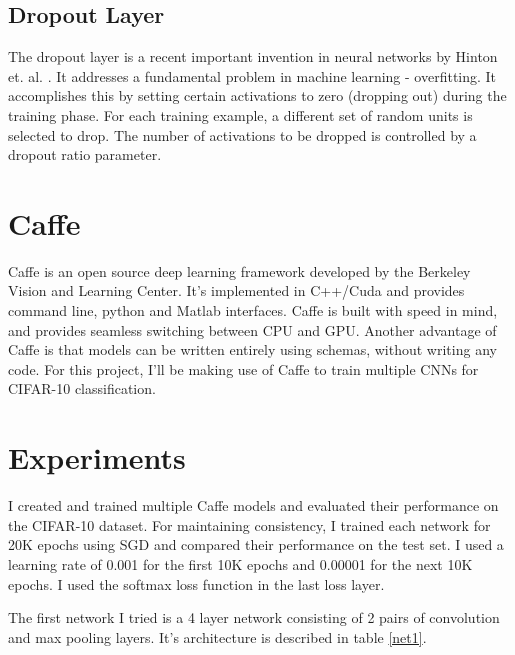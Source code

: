 \documentclass[10pt,twocolumn,letterpaper]{article}
\begin{document}
\subsection{Dropout Layer}
The dropout layer is a recent important invention in neural networks by Hinton et. al. \cite{hinton2012improving}. It addresses a fundamental problem in machine learning - overfitting. It accomplishes this by setting certain activations to zero (dropping out) during the training phase. For each training example, a different set of random units is selected to drop. The number of activations to be dropped is controlled by a dropout ratio parameter.




\section{Caffe}
Caffe is an open source deep learning framework developed by the Berkeley Vision and Learning Center. It's implemented in C++/Cuda and provides command line, python and Matlab interfaces. Caffe is built with speed in mind, and provides seamless switching between CPU and GPU. Another advantage of Caffe is that models can be written entirely using schemas, without writing any code. For this project, I'll be making use of Caffe to train multiple CNNs for CIFAR-10 classification.

\section{Experiments}

I created and trained multiple Caffe models and evaluated their performance on the CIFAR-10 dataset. For maintaining consistency, I trained each network for 20K epochs using SGD and compared their performance on the test set. I used a learning rate of 0.001 for the first 10K epochs and 0.00001 for the next 10K epochs. I used the softmax loss function in the last loss layer.

The first network I tried is a 4 layer network consisting of 2 pairs of convolution and max pooling layers. It's architecture is described in table \ref{net1}.
\end{document}
